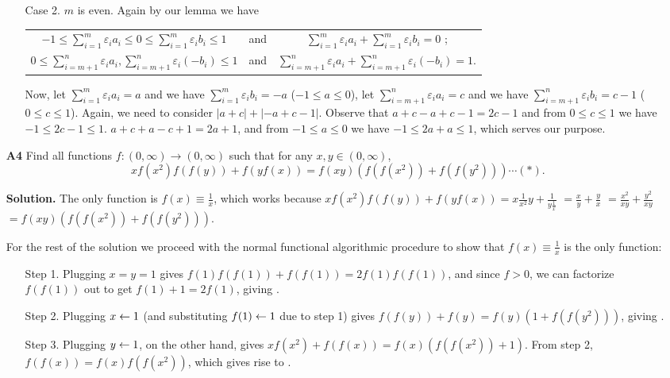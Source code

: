 \documentclass[11pt,a4paper]{article}
\begin{document}
\begin{itemize}
\begin{itemize}
\item [Case 2.] $m$ is even. 
 Again by our lemma we have 
\begin{center}
\begin{tabular}{c c c} 
$-1\le \sum_{i=1}^m \varepsilon_i a_i\le 0\le \sum_{i=1}^m \varepsilon_i b_i\le 1$
& and & $\sum_{i=1}^m \varepsilon_i a_i +\sum_{i=1}^m \varepsilon_i b_i=0$ ; \\ 
$0\le \sum_{i=m+1}^n \varepsilon_i a_i,  \sum_{i=m+1}^n \varepsilon_i (-b_i)\le 1$
& and & $\sum_{i=m+1}^n \varepsilon_i a_i +\sum_{i=m+1}^n \varepsilon_i (-b_i)=1$. \\ 
\end{tabular} 
\end{center}
Now, let $\sum_{i=1}^m \varepsilon_i a_i=a$ and we have $\sum_{i=1}^m \varepsilon_i b_i=-a$ ($-1\le a\le 0$), 
let $\sum_{i=m+1}^n \varepsilon_i a_i=c$ and we have $\sum_{i=m+1}^n \varepsilon_i b_i=c-1$ ($0\le c\le 1$). 
Again, we need to consider $|a+c|+|-a+c-1|$. 
Observe that $a+c-a+c-1=2c-1$ and from $0\le c\le 1$ we have $-1\le 2c-1\le 1$. 
$a+c+a-c+1=2a+1$, and from $-1\le a\le 0$ we have $-1\le 2a+a\le 1$, which serves our purpose. 
\end{itemize}

\newpage
\item[\textbf{A4}]
Find all functions $f:(0,\infty)\rightarrow (0,\infty)$ such that for any $x,y\in (0,\infty)$, $$xf(x^2)f(f(y)) + f(yf(x)) = f(xy) \left(f(f(x^2)) + f(f(y^2))\right)\cdots (*).$$

\textbf{Solution.} 
The only function is $f(x)\equiv \frac 1x$, which works because 
$xf(x^2)f(f(y)) + f(yf(x))=x\frac1 {x^2} y+\frac 1 {y\frac 1{x}}$
$=\frac xy+\frac yx$
$=\frac{x^2}{xy}+\frac{y^2}{xy}$
$=f(xy)\left(f(f(x^2)) + f(f(y^2))\right)$. 

For the rest of the solution we proceed with the normal functional algorithmic procedure to show that $f(x)\equiv \frac 1x$ is the only function: 
\begin{itemize}
\item [Step 1.] 
Plugging $x=y=1$ gives $f(1)f(f(1))+f(f(1))=2f(1)f(f(1))$, 
and since $f>0$, we can factorize $f(f(1))$ out to get $f(1)+1=2f(1)$, giving . 

\item [Step 2.]
Plugging $x\leftarrow 1$ (and substituting $f(1)\leftarrow 1$ due to step 1) gives $f(f(y))+f(y)=f(y)(1+f(f(y^2)))$, 
giving . 

\item [Step 3.]
Plugging $y\leftarrow 1$, on the other hand, gives 
$xf(x^2)+f(f(x))=f(x)(f(f(x^2))+1)$. 
From step 2, $f(f(x))=f(x)f(f(x^2))$, 
which gives rise to . 


\end{itemize}
\end{itemize}
\end{document}
